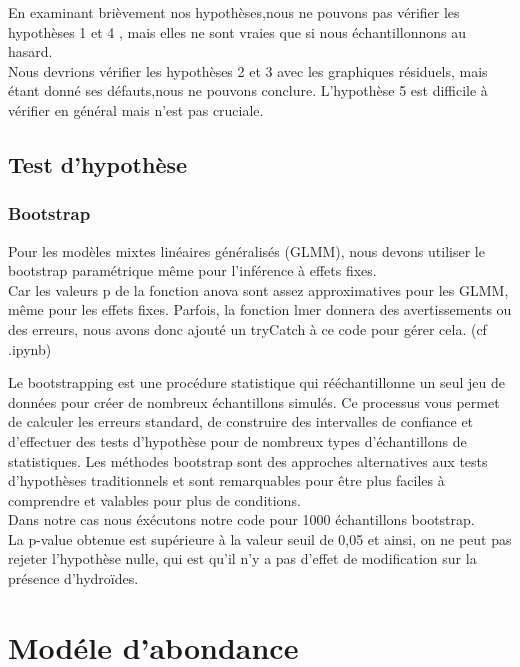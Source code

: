 \documentclass{article}
\theoremstyle{definition}
\begin{document}
En examinant brièvement nos hypothèses,nous ne pouvons pas vérifier les hypothèses 1 et 4 , mais elles ne sont vraies que si nous échantillonnons au hasard.\\
Nous devrions vérifier les hypothèses 2 et 3 avec les graphiques résiduels, mais étant donné ses défauts,nous ne pouvons conclure. L'hypothèse 5 est difficile à vérifier en général mais n'est pas cruciale.



\newpage


\subsection{Test d'hypothèse}

\vspace{2cm}

\subsubsection{Bootstrap}

Pour les modèles mixtes linéaires généralisés (GLMM), nous devons utiliser le bootstrap paramétrique même pour l'inférence à effets fixes.\\
Car les valeurs p de la fonction anova sont assez approximatives pour les GLMM, même pour les effets fixes.
Parfois, la fonction lmer donnera des avertissements ou des erreurs, nous avons donc ajouté un tryCatch à ce code pour gérer cela. (cf .ipynb)


Le bootstrapping est une procédure statistique qui rééchantillonne un seul jeu de données pour créer de nombreux échantillons simulés. Ce processus vous permet de calculer les erreurs standard, de construire des intervalles de confiance et d'effectuer des tests d'hypothèse pour de nombreux types d'échantillons de statistiques. Les méthodes bootstrap sont des approches alternatives aux tests d'hypothèses traditionnels et sont remarquables pour être plus faciles à comprendre et valables pour plus de conditions.
\\
Dans notre cas nous éxécutons notre code pour 1000 échantillons bootstrap.
\\


La p-value obtenue est supérieure à la valeur seuil de 0,05 et ainsi, on ne peut pas rejeter l'hypothèse nulle, qui est qu'il n'y a pas d'effet de modification sur la présence d'hydroïdes.


\section{Modéle d'abondance}
\end{document}
